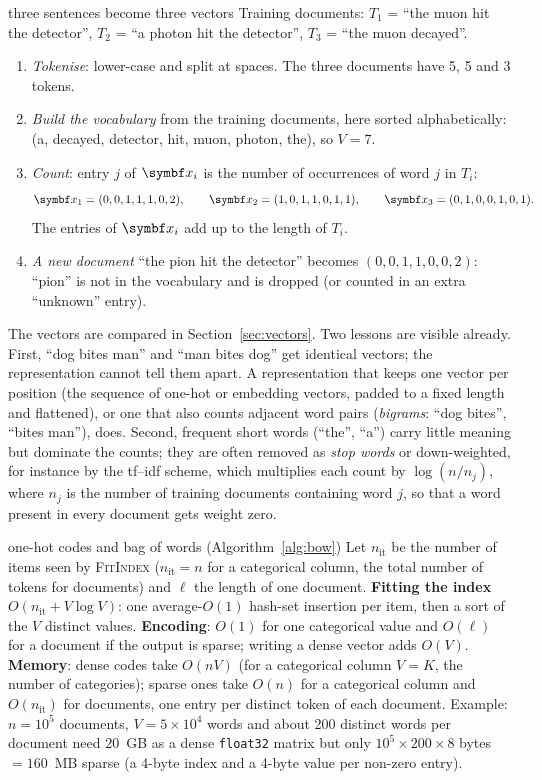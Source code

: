 \documentclass[11pt]{article}
\begin{document}
\begin{worked}{three sentences become three vectors}
Training documents: $T_1$ = ``the muon hit the detector'', $T_2$ = ``a photon hit the detector'', $T_3$ = ``the muon
decayed''.
\begin{enumerate}
\item \emph{Tokenise}: lower-case and split at spaces. The three documents have 5, 5 and 3 tokens.
\item \emph{Build the vocabulary} from the training documents, here sorted alphabetically: (a, decayed, detector, hit,
muon, photon, the), so $V = 7$.
\item \emph{Count}: entry $j$ of $\x_i$ is the number of occurrences of word $j$ in $T_i$:
\[
  \x_1 = (0, 0, 1, 1, 1, 0, 2), \qquad \x_2 = (1, 0, 1, 1, 0, 1, 1), \qquad \x_3 = (0, 1, 0, 0, 1, 0, 1).
\]
The entries of $\x_i$ add up to the length of $T_i$.
\item \emph{A new document} ``the pion hit the detector'' becomes $(0, 0, 1, 1, 0, 0, 2)$: ``pion'' is not in the
vocabulary and is dropped (or counted in an extra ``unknown'' entry).
\end{enumerate}
The vectors are compared in Section~\ref{sec:vectors}. Two lessons are visible already. First, ``dog bites man'' and
``man bites dog'' get identical vectors; the representation cannot tell them apart. A representation that keeps one
vector per position (the sequence of one-hot or embedding vectors, padded to a fixed length and flattened), or one
that also counts adjacent word pairs (\emph{bigrams}: ``dog bites'', ``bites man''), does. Second, frequent short words
(``the'', ``a'') carry little meaning but dominate the counts; they are often removed as \emph{stop words} or
down-weighted, for instance by the tf--idf scheme, which multiplies each count by $\log(n / n_j)$, where $n_j$ is
the number of training documents containing word $j$, so that a word present in every document gets weight zero.
\end{worked}


\begin{runtime}{one-hot codes and bag of words (Algorithm~\ref{alg:bow})}
Let $n_{\mathrm{it}}$ be the number of items seen by \textsc{FitIndex} ($n_{\mathrm{it}} = n$ for a categorical column, the total number of tokens
for documents) and $\ell$ the length of one document. \textbf{Fitting the index} $O(n_{\mathrm{it}} + V \log V)$: one
average-$O(1)$ hash-set insertion per item, then a sort of the $V$ distinct values. \textbf{Encoding}: $O(1)$ for one
categorical value and $O(\ell)$ for a document if the output is sparse; writing a dense vector adds $O(V)$.
\textbf{Memory}: dense codes take $O(nV)$ (for a categorical column $V = K$, the number of categories); sparse ones
take $O(n)$ for a categorical column and $O(n_{\mathrm{it}})$ for documents, one entry per distinct token of each document. Example:
$n = 10^5$ documents, $V = 5 \times 10^4$ words and about 200 distinct words per document need $20$~GB as a dense
\texttt{float32} matrix but only $10^5 \times 200 \times 8$ bytes $= 160$~MB sparse (a 4-byte index and a 4-byte value
per non-zero entry).
\end{runtime}
\end{document}
